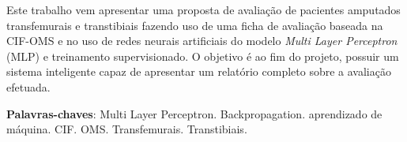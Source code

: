 \begin{resumo}

 Este trabalho vem apresentar uma proposta de avaliação de pacientes amputados transfemurais e transtibiais fazendo uso de uma ficha de avaliação baseada na CIF-OMS e no uso de redes neurais artificiais do modelo \textit{Multi Layer Perceptron} (MLP) e treinamento supervisionado. O objetivo é ao fim do projeto, possuir um sistema inteligente capaz de apresentar um relatório completo sobre a avaliação efetuada.

 \vspace{\onelineskip}

 \noindent
 \textbf{Palavras-chaves}: Multi Layer Perceptron. Backpropagation. aprendizado de máquina. CIF. OMS. Transfemurais. Transtibiais.
\end{resumo}
